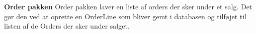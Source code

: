 \textbf{Order pakken}\newline
Order pakken laver en liste af orders der sker under et salg. Det gør den ved at oprette en OrderLine som bliver gemt i databasen og tilføjet til listen af de Orders der sker under salget. 

